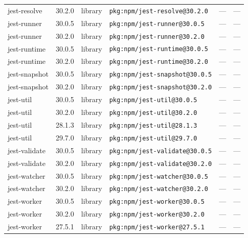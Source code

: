 \documentclass[11pt,a4paper]{article}
\begin{document}
\begin{longtable}{|p{4cm}|p{2cm}|p{1.6cm}|p{5cm}|p{1.5cm}|p{3.5cm}|}
\raggedright jest-resolve & 30.2.0 & library & \small\texttt{pkg:npm/jest-resolve@30.2.0} & — & \small — \\
\raggedright jest-runner & 30.0.5 & library & \small\texttt{pkg:npm/jest-runner@30.0.5} & — & \small — \\
\raggedright jest-runner & 30.2.0 & library & \small\texttt{pkg:npm/jest-runner@30.2.0} & — & \small — \\
\raggedright jest-runtime & 30.0.5 & library & \small\texttt{pkg:npm/jest-runtime@30.0.5} & — & \small — \\
\raggedright jest-runtime & 30.2.0 & library & \small\texttt{pkg:npm/jest-runtime@30.2.0} & — & \small — \\
\raggedright jest-snapshot & 30.0.5 & library & \small\texttt{pkg:npm/jest-snapshot@30.0.5} & — & \small — \\
\raggedright jest-snapshot & 30.2.0 & library & \small\texttt{pkg:npm/jest-snapshot@30.2.0} & — & \small — \\
\raggedright jest-util & 30.0.5 & library & \small\texttt{pkg:npm/jest-util@30.0.5} & — & \small — \\
\raggedright jest-util & 30.2.0 & library & \small\texttt{pkg:npm/jest-util@30.2.0} & — & \small — \\
\raggedright jest-util & 28.1.3 & library & \small\texttt{pkg:npm/jest-util@28.1.3} & — & \small — \\
\raggedright jest-util & 29.7.0 & library & \small\texttt{pkg:npm/jest-util@29.7.0} & — & \small — \\
\raggedright jest-validate & 30.0.5 & library & \small\texttt{pkg:npm/jest-validate@30.0.5} & — & \small — \\
\raggedright jest-validate & 30.2.0 & library & \small\texttt{pkg:npm/jest-validate@30.2.0} & — & \small — \\
\raggedright jest-watcher & 30.0.5 & library & \small\texttt{pkg:npm/jest-watcher@30.0.5} & — & \small — \\
\raggedright jest-watcher & 30.2.0 & library & \small\texttt{pkg:npm/jest-watcher@30.2.0} & — & \small — \\
\raggedright jest-worker & 30.0.5 & library & \small\texttt{pkg:npm/jest-worker@30.0.5} & — & \small — \\
\raggedright jest-worker & 30.2.0 & library & \small\texttt{pkg:npm/jest-worker@30.2.0} & — & \small — \\
\raggedright jest-worker & 27.5.1 & library & \small\texttt{pkg:npm/jest-worker@27.5.1} & — & \small — \\

\end{longtable}
\end{document}
